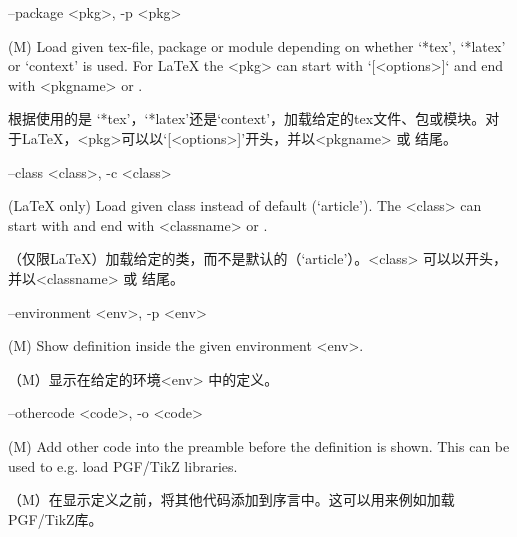 \documentclass{article}
\newenvironment{options}{%
    \def\cstart{\begingroup\ttfamily\par\noindent\ignorespaces}%
    \def\csep{\endgroup\begingroup\list {}{}\item \relax}%
    \def\cend{\endlist\par\medskip\endgroup\cstart}%
    \cstart
}{%
    \endgroup
}
\begin{document}
\begin{options}
  --package \MacroArgs<pkg>, -p \MacroArgs<pkg>      \csep
(M) Load given tex-file, package or module depending on whether `*tex', `*latex'
or `context' is used. For LaTeX the \MacroArgs<pkg> can start with `[<options>]` and end
with \MacroArgs<pkgname> or .

根据使用的是 `*tex'，`*latex'还是`context'，加载给定的tex文件、包或模块。对于LaTeX，\MacroArgs<pkg>可以以`[<options>]'开头，并以\MacroArgs<pkgname> 或 结尾。
\cend
\end{options}

\begin{options}
  --class \MacroArgs<class>, -c \MacroArgs<class>    \csep 
(LaTeX only) Load given class instead of default (`article').
The \MacroArgs<class> can start with  and end
with \MacroArgs<classname> or .
  
（仅限LaTeX）加载给定的类，而不是默认的（`article'）。\MacroArgs<class> 可以以 开头，并以\MacroArgs<classname> 或 结尾。
  \cend
\end{options}

\begin{options}
  --environment \MacroArgs<env>, -p \MacroArgs<env>  \csep 
(M) Show definition inside the given environment \MacroArgs<env>.

（M）显示在给定的环境\MacroArgs<env> 中的定义。
\cend
\end{options}

\begin{options}
  --othercode \MacroArgs<code>, -o \MacroArgs<code>  \csep
(M) Add other code into the preamble before the definition is shown.
This can be used to e.g. load PGF/TikZ libraries.

（M）在显示定义之前，将其他代码添加到序言中。这可以用来例如加载PGF/TikZ库。
  \cend
\end{options}
\end{document}
